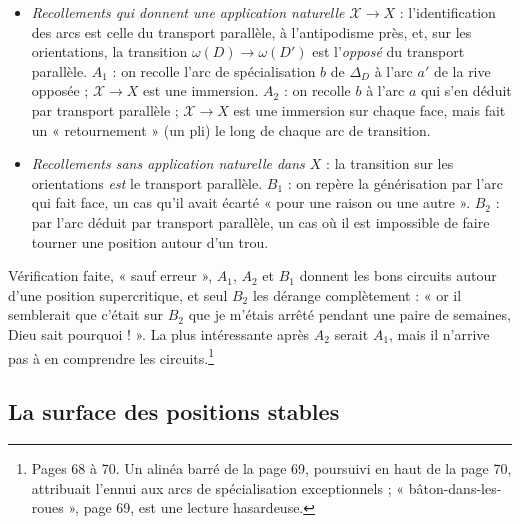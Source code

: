 \documentclass[11pt,a4paper]{article}
\begin{document}
\begin{itemize}

\item[A)] \emph{Recollements qui donnent une application naturelle
$\mathcal{X} \to X$} : l'identification des arcs est celle du transport
parallèle, à l'antipodisme près, et, sur les orientations, la transition
$\omega(D) \to \omega(D')$ est l'\emph{opposé} du transport parallèle.
$A_1$ : on recolle l'arc de spécialisation $b$ de $\Delta_D$ à l'arc $a'$ de la
rive opposée ; $\mathcal{X} \to X$ est une immersion. $A_2$ : on recolle $b$ à
l'arc $a$ qui s'en déduit par transport parallèle ; $\mathcal{X} \to X$ est une
immersion sur chaque face, mais fait un « retournement » (un pli) le long de
chaque arc de transition.
\item[B)] \emph{Recollements sans application naturelle dans $X$} : la
transition sur les orientations \emph{est} le transport parallèle. $B_1$ : on
repère la générisation par l'arc qui fait face, un cas qu'il avait écarté « pour une raison ou une autre ». $B_2$ : par l'arc déduit par transport parallèle, un cas où il
est impossible de faire tourner une position autour d'un trou.
\end{itemize}
Vérification faite, « sauf erreur », $A_1$, $A_2$ et $B_1$ donnent les bons
circuits autour d'une position supercritique, et seul $B_2$ les dérange
complètement : « or il semblerait que c'était sur $B_2$ que je m'étais arrêté
pendant une paire de semaines, Dieu sait pourquoi ! ». La plus intéressante
après $A_2$ serait $A_1$, mais il n'arrive pas à en comprendre les
circuits.\footnote{Pages 68 à 70. Un alinéa barré de la page 69, poursuivi en
haut de la page 70, attribuait l'ennui aux arcs de spécialisation
exceptionnels ; « bâton-dans-les-roues », page 69, est une lecture hasardeuse.}

\subsection*{La surface des positions stables}
\end{document}
